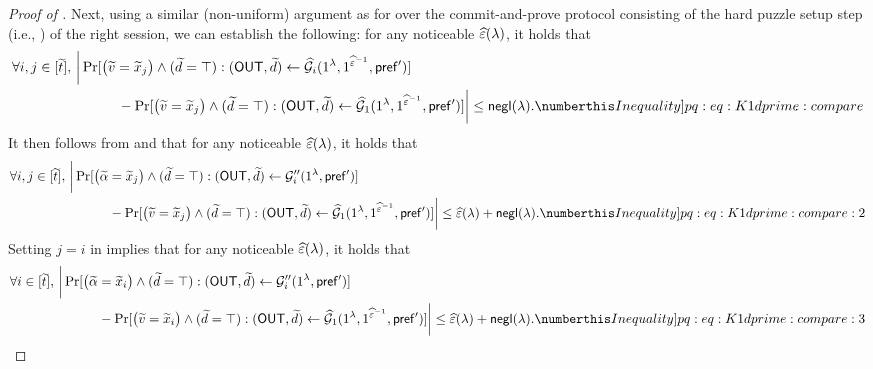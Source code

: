 \begin{proof}[Proof of ]
Next, using a similar (non-uniform) argument as for  over the commit-and-prove protocol consisting of the hard puzzle setup step (i.e., ) of the right session, we can establish the following: for any noticeable $\widehat{\varepsilon}(\lambda)$, it holds that
    \begin{align*}
        \forall i,j \in [\tilde{t}],~& \bigg| \Pr[\big( \tilde{v} = \tilde{x}_j \big)\wedge (\tilde{d} = \top): (\OUT, \tilde{d}) \gets \mcal{\hat{G}}_i(1^\secpar, 1^{\hat{\epsilon}^{-1}}, \msf{pref'})] \\
         &\hspace{3em} - \Pr[\big( \tilde{v} = \tilde{x}_j \big)\wedge (\tilde{d} = \top): (\OUT, \tilde{d}) \gets \mcal{\hat{G}}_1(1^\secpar, 1^{\hat{\epsilon}^{-1}}, \msf{pref'})] \bigg| 
         \leq \negl(\secpar). \numberthis \label[Inequality]{pq:eq:K1dprime:compare}
    \end{align*} 
It then follows from  and  that for any noticeable $\widehat{\varepsilon}(\lambda)$, it holds that
    \begin{align*}
        \forall i,j \in [\tilde{t}],~& \bigg| \Pr[\big( \tilde{\alpha} = \tilde{x}_j \big)\wedge (\tilde{d} = \top): (\OUT,\tilde{d}) \gets \mcal{G}_i''(1^\secpar, \msf{pref'})] \\
         &\hspace{3em} - \Pr[\big( \tilde{v} = \tilde{x}_j \big)\wedge (\tilde{d} = \top): (\OUT, \tilde{d}) \gets \mcal{\hat{G}}_1(1^\secpar, 1^{\hat{\epsilon}^{-1}}, \msf{pref'})] \bigg| 
         \leq \hat{\epsilon}(\secpar) +  \negl(\secpar). \numberthis \label[Inequality]{pq:eq:K1dprime:compare:2}
    \end{align*} 
Setting $j = i$ in  implies that for any noticeable $\widehat{\varepsilon}(\lambda)$, it holds that
    \begin{align*}
        \forall i \in [\tilde{t}],~& \bigg| \Pr[\big( \tilde{\alpha} = \tilde{x}_i \big)\wedge (\tilde{d} = \top): (\OUT,\tilde{d}) \gets \mcal{G}_i''(1^\secpar, \msf{pref'})] \\
         &\hspace{3em} - \Pr[\big( \tilde{v} = \tilde{x}_i \big)\wedge (\tilde{d} = \top): (\OUT, \tilde{d}) \gets \mcal{\hat{G}}_1(1^\secpar, 1^{\hat{\epsilon}^{-1}}, \msf{pref'})] \bigg| 
         \leq \hat{\epsilon}(\secpar) +  \negl(\secpar). \numberthis \label[Inequality]{pq:eq:K1dprime:compare:3}
    \end{align*} 

\end{proof}
